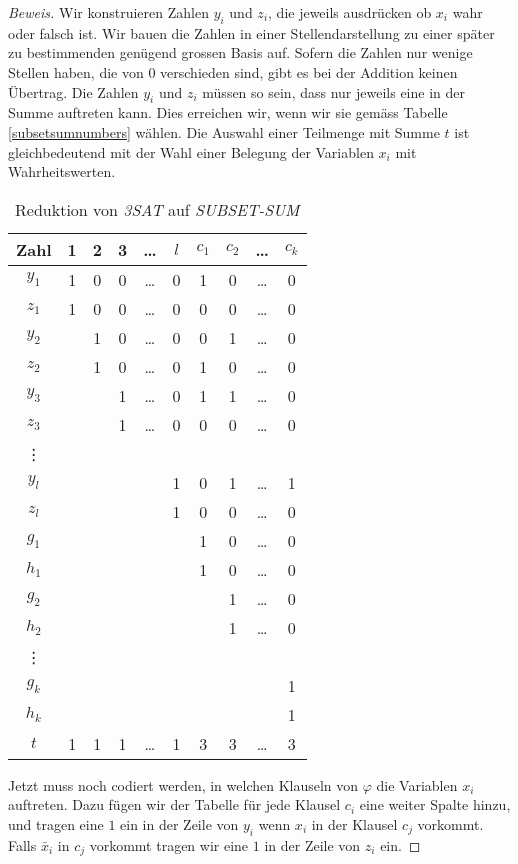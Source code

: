 \begin{proof}[Beweis]
Wir konstruieren Zahlen $y_i$ und $z_i$, die jeweils ausdrücken
ob $x_i$ wahr oder falsch ist. Wir bauen die Zahlen in einer
Stellendarstellung zu einer später zu bestimmenden genügend
grossen Basis auf. Sofern die Zahlen nur wenige Stellen haben, die 
von $0$ verschieden sind, gibt es bei der Addition keinen Übertrag.
Die Zahlen $y_i$ und $z_i$ müssen so sein, dass nur jeweils eine
in der Summe auftreten kann. Dies erreichen wir, wenn wir
sie gemäss Tabelle \ref{subsetsumnumbers} wählen.
Die Auswahl einer Teilmenge mit Summe $t$ ist gleichbedeutend
mit der Wahl einer Belegung der Variablen $x_i$ mit Wahrheitswerten.
\begin{table}
\begin{center}
\begin{tabular}{|c|ccccc|cccc|}
\hline
Zahl&1&2&3&\dots&$l$&$c_1$&$c_2$&\dots&$c_k$\\
\hline
$y_1$&1&0&0&\dots&0&1&0&\dots&0\\
$z_1$&1&0&0&\dots&0&0&0&\dots&0\\
$y_2$& &1&0&\dots&0&0&1&\dots&0\\
$z_2$& &1&0&\dots&0&1&0&\dots&0\\
$y_3$& & &1&\dots&0&1&1&\dots&0\\
$z_3$& & &1&\dots&0&0&0&\dots&0\\
\vdots&& & &     & & & &     & \\
$y_l$& & & &     &1&0&1&\dots&1\\
$z_l$& & & &     &1&0&0&\dots&0\\
\hline
$g_1$& & & &     & &1&0&\dots&0\\
$h_1$& & & &     & &1&0&\dots&0\\
$g_2$& & & &     & & &1&\dots&0\\
$h_2$& & & &     & & &1&\dots&0\\
\vdots&& & &     & & & &     & \\
$g_k$& & & &     & & & &     &1\\
$h_k$& & & &     & & & &     &1\\
\hline
$t$  &1&1&1&\dots&1&3&3&\dots&3\\
\hline
\end{tabular}
\end{center}
\caption{Reduktion von \textsl{3SAT} auf
\textsl{SUBSET-SUM}\label{subsetsumtable}}
\end{table}

Jetzt muss noch codiert werden, in welchen Klauseln von $\varphi$ 
die Variablen $x_i$ auftreten. Dazu fügen wir der Tabelle für jede
Klausel $c_i$ eine weiter Spalte hinzu, und tragen eine $1$ ein
in der Zeile von $y_i$ wenn $x_i$ in der Klausel $c_j$ vorkommt.
Falls $\bar x_i$ in $c_j$ vorkommt tragen wir eine $1$ in der Zeile
von $z_i$ ein.


\end{proof}
